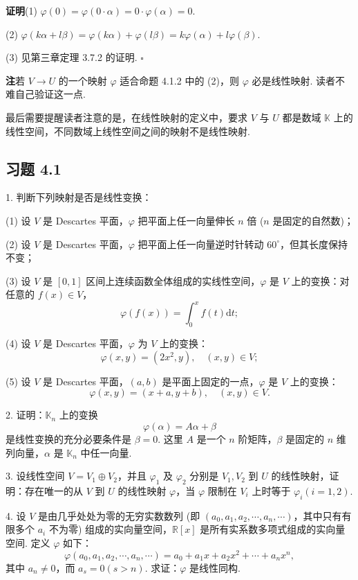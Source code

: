 \documentclass[UTF8,12pt,a4paper,fontset=fandol]{ctexart}
\begin{document}
\noindent\textbf{证明}\quad (1) $\varphi(0)=\varphi(0\cdot\alpha)=0\cdot\varphi(\alpha)=0$.

(2) $\varphi(k\alpha+l\beta)=\varphi(k\alpha)+\varphi(l\beta)=k\varphi(\alpha)+l\varphi(\beta)$.

(3) 见第三章定理 3.7.2 的证明. $\square$

\noindent\textbf{注}\quad 若 $V\to U$ 的一个映射 $\varphi$ 适合命题 4.1.2 中的 (2)，则 $\varphi$ 必是线性映射. 读者不难自己验证这一点.

最后需要提醒读者注意的是，在线性映射的定义中，要求 $V$ 与 $U$ 都是数域 $\mathbb{K}$ 上的线性空间，不同数域上线性空间之间的映射不是线性映射.

\subsection*{习题 4.1}

1. 判断下列映射是否是线性变换：

(1) 设 $V$ 是 Descartes 平面，$\varphi$ 把平面上任一向量伸长 $n$ 倍 ($n$ 是固定的自然数)；

(2) 设 $V$ 是 Descartes 平面，$\varphi$ 把平面上任一向量逆时针转动 $60^\circ$，但其长度保持不变；

(3) 设 $V$ 是 $[0,1]$ 区间上连续函数全体组成的实线性空间，$\varphi$ 是 $V$ 上的变换：对任意的 $f(x)\in V$，
\[
\varphi(f(x))=\int_0^x f(t)\mathrm{d}t;
\]

(4) 设 $V$ 是 Descartes 平面，$\varphi$ 为 $V$ 上的变换：
\[
\varphi(x,y)=(2x^2,y),\quad (x,y)\in V;
\]

(5) 设 $V$ 是 Descartes 平面，$(a,b)$ 是平面上固定的一点，$\varphi$ 是 $V$ 上的变换：
\[
\varphi(x,y)=(x+a,y+b),\quad (x,y)\in V.
\]

2. 证明：$\mathbb{K}_n$ 上的变换
\[
\varphi(\alpha)=A\alpha+\beta
\]
是线性变换的充分必要条件是 $\beta=0$. 这里 $A$ 是一个 $n$ 阶矩阵，$\beta$ 是固定的 $n$ 维列向量，$\alpha$ 是 $\mathbb{K}_n$ 中任一向量.

3. 设线性空间 $V=V_1\oplus V_2$，并且 $\varphi_1$ 及 $\varphi_2$ 分别是 $V_1,V_2$ 到 $U$ 的线性映射，证明：存在唯一的从 $V$ 到 $U$ 的线性映射 $\varphi$，当 $\varphi$ 限制在 $V_i$ 上时等于 $\varphi_i(i=1,2)$.

4. 设 $V$ 是由几乎处处为零的无穷实数数列 (即 $(a_0,a_1,a_2,\cdots,a_n,\cdots)$，其中只有有限多个 $a_i$ 不为零) 组成的实向量空间，$\mathbb{R}[x]$ 是所有实系数多项式组成的实向量空间. 定义 $\varphi$ 如下：
\[
\varphi(a_0,a_1,a_2,\cdots,a_n,\cdots)=a_0+a_1x+a_2x^2+\cdots+a_nx^n,
\]
其中 $a_n\neq 0$，而 $a_s=0(s>n)$. 求证：$\varphi$ 是线性同构.
\end{document}
